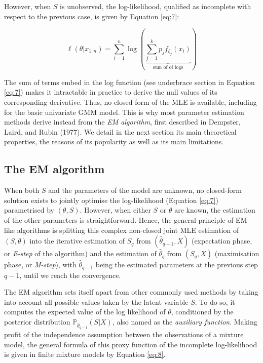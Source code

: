 However, when \(S\) is unobserved, the log-likelihood, qualified as
incomplete with respect to the previous case, is given by Equation
\eqref{eq:7}:

\begin{equation}
\ell (\theta \vert x_{1:n}) = \sum_{i=1}^n  \log \left( \underbrace{\sum_{j=1}^k  p_j f_{\zeta_j}(x_i)}_{\text{sum of of logs}} \right)
\label{eq:7}
\end{equation}

The sum of terms embed in the log function (see underbrace section in Equation \eqref{eq:7}) makes it intractable in practice to derive the null values of its corresponding derivative. Thus, no closed form of the MLE is available,
including for the basic univariate GMM model. This is why most
parameter estimation methods derive instead from the \emph{EM algorithm},
first described in Dempster, Laird, and Rubin (1977). We detail in the next section its
main theoretical properties, the reasons of its popularity as well as
its main limitations.

\hypertarget{the-em-algorithm}{%
\subsection{The EM algorithm}\label{the-em-algorithm}}

When both \(S\) and the parameters of the model are unknown, no closed-form solution exists to jointly optimise the log-likelihood (Equation \eqref{eq:7}) parametrised by \(({\theta}, S)\).
However, when either \(S\) or \(\theta\) are known, the estimation of the
other parameters is straightforward. Hence, the general principle of
EM-like algorithms is splitting this complex non-closed joint MLE
estimation of \((S, \theta)\) into the iterative estimation of \(S_q\) from
\((\hat{\theta}_{q-1}, X)\) (expectation phase, or \emph{E-step} of the algorithm)
and the estimation of \(\hat{\theta}_{q}\) from \((S_q, X)\) (maximisation phase, or
\emph{M-step}), with \(\hat{\theta}_{q-1}\) being the estimated parameters at the
previous step \(q-1\), until we reach the convergence.

The EM algorithm sets itself apart from other commonly used methods by taking
into account all possible values taken by the latent variable \(S\). To do
so, it computes the expected value of the log likelihood of \(\theta\),
conditioned by the posterior distribution
\(\mathbb{P}_{\hat{\theta}_{q-1}} (S|X)\), also named as the \emph{auxiliary
function}. Making profit of the independence assumption between the
observations of a mixture model, the general formula of this proxy
function of the incomplete log-likelihood is given in finite mixture
models by Equation \eqref{eq:8}.

